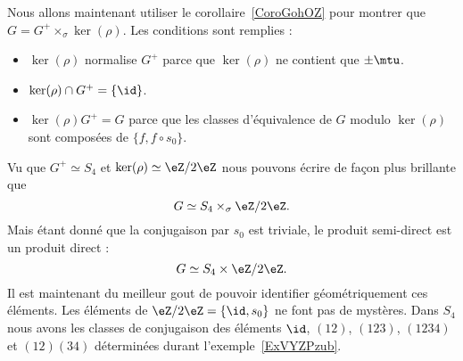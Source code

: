 Nous allons maintenant utiliser le corollaire~\ref{CoroGohOZ} pour montrer que \( G=G^+\times_{\sigma}\ker(\rho)\). Les conditions sont remplies :
\begin{itemize}
    \item \( \ker(\rho)\) normalise \( G^+\) parce que \( \ker(\rho)\) ne contient que \( \pm\mtu\).
    \item \( \ker(\rho)\cap G^+=\{ \id \}\).
    \item \( \ker(\rho)G^+=G\) parce que les classes d'équivalence de \( G\) modulo \( \ker(\rho)\) sont composées de \( \{ f,f\circ s_0 \}\).
\end{itemize}
Vu que \( G^+\simeq S_4\) et \( \ker(\rho)\simeq \eZ/2\eZ\) nous pouvons écrire de façon plus brillante que
\begin{equation}
    G\simeq S_4\times_{\sigma}\eZ/2\eZ.
\end{equation}
Mais étant donné que la conjugaison par \( s_0\) est triviale, le produit semi-direct est un produit direct :
\begin{equation}
    G\simeq S_4\times\eZ/2\eZ.
\end{equation}
Il est maintenant du meilleur gout de pouvoir identifier géométriquement ces éléments. Les éléments de \( \eZ/2\eZ=\{ \id,s_0 \}\) ne font pas de mystères. Dans \( S_4\) nous avons les classes de conjugaison des éléments \( \id\), \( (12)\), \( (123)\), \( (1234)\) et \( (12)(34)\) déterminées durant l'exemple~\ref{ExVYZPzub}.
